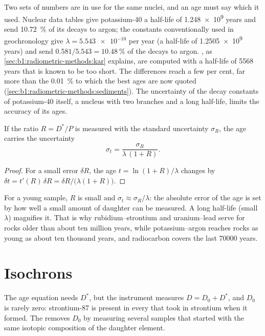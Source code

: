 Two sets of numbers are in use for the same nuclei, and an age must say which
it used. Nuclear data tables give potassium-40 a half-life of
\num{1.248e9} years and send \qty{10.72}{\percent} of its decays to argon; the
constants conventionally used in geochronology give $\lambda = \num{5.543e-10}$ per year (a half-life of \num{1.2505e9}
years) and send $0.581/5.543 = \qty{10.48}{\percent}$ of the decays to argon.
, as \cref{sec:b1:radiometric-methods:kar} explains, are
computed with a half-life of \num{5568} years that is known to be too short. The
differences reach a few per cent, far more than the \qty{0.01}{\percent} to which
the best ages are now quoted (\cref{sec:b1:radiometric-methods:sediments}).
The uncertainty of the decay constants of potassium-40 itself, a nucleus with
two branches and a long half-life, limits the accuracy of its ages.

\begin{proposition}\label{prop:b1:radiometric-methods:precision}
If the ratio $R = D^*/P$ is measured with the standard uncertainty $\sigma_R$,
the age carries the uncertainty
\[
  \sigma_t = \frac{\sigma_R}{\lambda\,(1 + R)}.
\]
\end{proposition}

\begin{proof}
For a small error $\delta R$, the age $t = \ln(1+R)/\lambda$ changes by
$\delta t = t'(R)\,\delta R = \delta R/\bigl(\lambda(1 + R)\bigr)$.
\end{proof}

For a young sample, $R$ is small and $\sigma_t \approx \sigma_R/\lambda$: the
absolute error of the age is set by how well a small amount of daughter can be
measured. A long half-life (small $\lambda$) magnifies it. That is why
rubidium--strontium and uranium--lead serve for rocks older than about ten
million years, while potassium--argon reaches rocks as young as about ten
thousand years, and radiocarbon covers the last \num{70000} years.

\section{Isochrons}\label{sec:b1:radiometric-methods:isochrons}

The age equation needs $D^*$, but the instrument measures $D = D_0 + D^*$, and
$D_0$ is rarely zero: strontium-87 is present in every  that took in
strontium when it formed. The  removes $D_0$ by measuring several
samples that started with the same isotopic composition of the daughter element.

